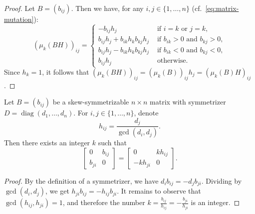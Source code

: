 \documentclass[ALCO,ThmDefs,Unicode,epreuves,published]{cedram}
\DeclareMathOperator{\diag}{diag}
\begin{document}
\begin{proof}
Let $B=(b_{ij})$. Then we have, for any $i,j\in\{1,\dots,n\}$ (cf.~\eqref{eq:matrix-mutation}): 
\[
(\mu_k(BH))_{ij}=\begin{cases} -b_{ij}h_j &\text{ if }i=k\text{ or }j=k, \\
b_{ij}h_j+b_{ik}h_k b_{kj} h_j &\text{ if }b_{ik}>0\text{ and }b_{kj}>0,\\
b_{ij}h_j-b_{ik}h_k b_{kj} h_j&\text{ if }b_{ik}<0\text{ and }b_{kj}<0,\\ 
b_{ij}h_j &\text{ otherwise.} 
\end{cases}
\] 
Since $h_k=1$, it follows that $(\mu_k(BH))_{ij}=(\mu_k(B))_{ij}h_j=(\mu_k(B)H)_{ij}$. 
\end{proof}


\begin{lemma}
\label{lem:bij-divisible}
Let $B=(b_{ij})$ be a skew-symmetrizable $n\times n$ matrix with symmetrizer $D=\diag (d_1,\dots,d_n)$. 
For $i,j\in\{1,\dots,n\}$, denote
\begin{equation}
\label{eq:hij}
h_{ij}=\frac{d_j}{\gcd(d_i,d_j)} .
\end{equation}
Then %
there exists an integer $k$ such that 
\[
\begin{bmatrix}
0 & b_{ij} \\
b_{ji} & 0
\end{bmatrix}
= \begin{bmatrix}
0 & kh_{ij} \\
-kh_{ji} & 0
\end{bmatrix} .
\]
\end{lemma}

\begin{proof}
By the definition of a symmetrizer, we have $d_i b_{ij}=-d_j b_{ji}$. Dividing by $\gcd(d_i,d_j)$, we get $h_{ji} b_{ij}=-h_{ij} b_{ji}$.
It remains to observe that $\gcd(h_{ij},h_{ji})=1$, and therefore the number 
$k=\frac{b_{ij}}{h_{ij}}=-\frac{b_{ji}}{h_{ji}}$ 
 is an integer. 
\end{proof}
\end{document}
